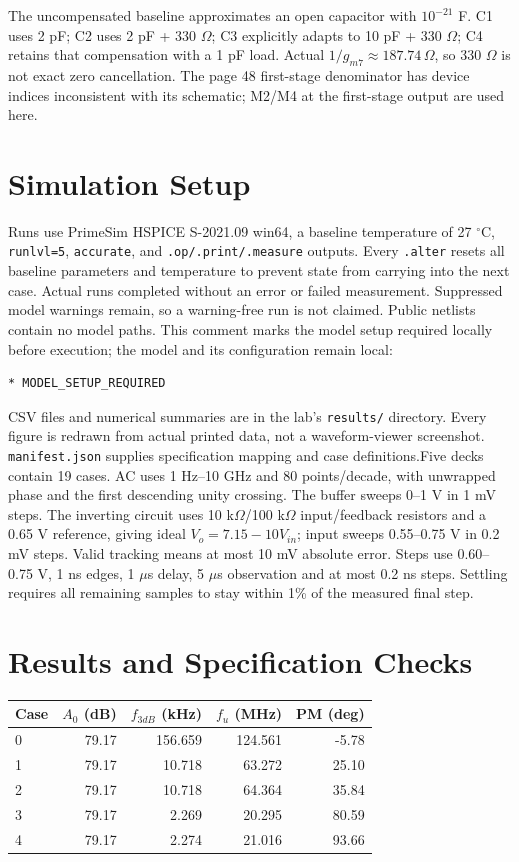 The uncompensated baseline approximates an open capacitor with $10^{-21}$ F. C1 uses 2 pF; C2 uses 2 pF + 330 $\Omega$; C3 explicitly adapts to 10 pF + 330 $\Omega$; C4 retains that compensation with a 1 pF load. Actual $1/g_{m7}\approx187.74\,\Omega$, so 330 $\Omega$ is not exact zero cancellation. The page 48 first-stage denominator has device indices inconsistent with its schematic; M2/M4 at the first-stage output are used here.

\section{Simulation Setup}
Runs use PrimeSim HSPICE S-2021.09 win64, a baseline temperature of 27 $^\circ$C, \texttt{runlvl=5}, \texttt{accurate}, and \texttt{.op/.print/.measure} outputs. Every \texttt{.alter} resets all baseline parameters and temperature to prevent state from carrying into the next case. Actual runs completed without an error or failed measurement. Suppressed model warnings remain, so a warning-free run is not claimed. Public netlists contain no model paths. This comment marks the model setup required locally before execution; the model and its configuration remain local:
\begin{verbatim}
* MODEL_SETUP_REQUIRED
\end{verbatim}
CSV files and numerical summaries are in the lab's \texttt{results/} directory. Every figure is redrawn from actual printed data, not a waveform-viewer screenshot. \texttt{manifest.json} supplies specification mapping and case definitions.Five decks contain 19 cases. AC uses 1 Hz--10 GHz and 80 points/decade, with unwrapped phase and the first descending unity crossing. The buffer sweeps 0--1 V in 1 mV steps. The inverting circuit uses 10 k$\Omega$/100 k$\Omega$ input/feedback resistors and a 0.65 V reference, giving ideal $V_o=7.15-10V_{in}$; input sweeps 0.55--0.75 V in 0.2 mV steps. Valid tracking means at most 10 mV absolute error. Steps use 0.60--0.75 V, 1 ns edges, 1 $\mu$s delay, 5 $\mu$s observation and at most 0.2 ns steps. Settling requires all remaining samples to stay within 1\% of the measured final step.

\section{Results and Specification Checks}
\begin{center}\small\begin{tabular}{lrrrr}\toprule
Case & $A_0$ (dB) & $f_{3dB}$ (kHz) & $f_u$ (MHz) & PM (deg) \\ \midrule
0 & 79.17 & 156.659 & 124.561 & -5.78 \\
1 & 79.17 & 10.718 & 63.272 & 25.10 \\
2 & 79.17 & 10.718 & 64.364 & 35.84 \\
3 & 79.17 & 2.269 & 20.295 & 80.59 \\
4 & 79.17 & 2.274 & 21.016 & 93.66 \\
\bottomrule\end{tabular}\end{center}

